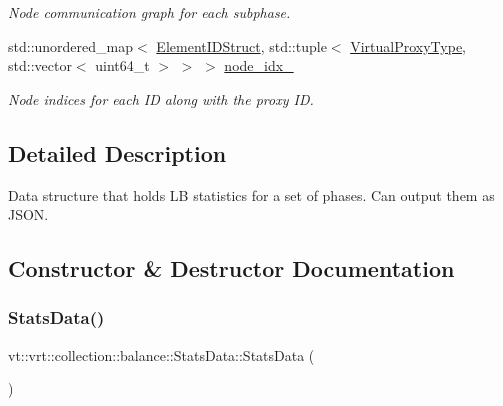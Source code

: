 \begin{DoxyCompactItemize}
\begin{DoxyCompactList}\small\item\em Node communication graph for each subphase. \end{DoxyCompactList}\item 
std\+::unordered\+\_\+map$<$ \hyperlink{structvt_1_1vrt_1_1collection_1_1balance_1_1_element_i_d_struct}{Element\+I\+D\+Struct}, std\+::tuple$<$ \hyperlink{namespacevt_a1b417dd5d684f045bb58a0ede70045ac}{Virtual\+Proxy\+Type}, std\+::vector$<$ uint64\+\_\+t $>$ $>$ $>$ \hyperlink{structvt_1_1vrt_1_1collection_1_1balance_1_1_stats_data_a28e705281f97d1afd659848de7af7d7b}{node\+\_\+idx\+\_\+}
\begin{DoxyCompactList}\small\item\em Node indices for each ID along with the proxy ID. \end{DoxyCompactList}\end{DoxyCompactItemize}


\subsection{Detailed Description}
Data structure that holds LB statistics for a set of phases. Can output them as J\+S\+ON. 

\subsection{Constructor \& Destructor Documentation}
\mbox{\label{structvt_1_1vrt_1_1collection_1_1balance_1_1_stats_data_a4456eb9f50cab15ee7cbd079603a4b6d}} 
\subsubsection{\texorpdfstring{Stats\+Data()}{StatsData()}\hspace{0.1cm}{\footnotesize\ttfamily [1/2]}}
{\footnotesize\ttfamily vt\+::vrt\+::collection\+::balance\+::\+Stats\+Data\+::\+Stats\+Data (\begin{DoxyParamCaption}{ }\end{DoxyParamCaption})\hspace{0.3cm}{\ttfamily [default]}}

